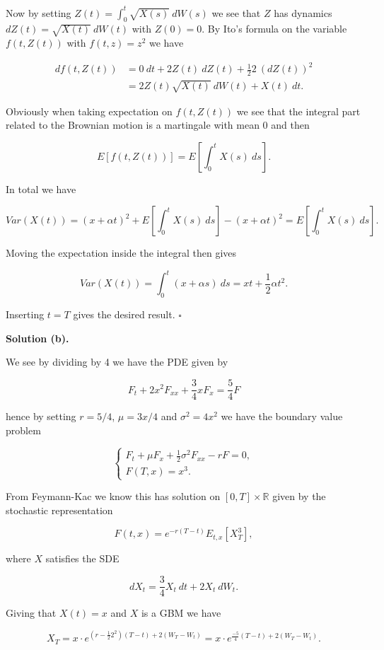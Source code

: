 \documentclass[
]{book}
\begin{document}
Now by setting \(Z(t)= \int_0^t\sqrt{X(s)}\ dW(s)\) we see that \(Z\) has dynamics \(dZ(t)=\sqrt{X(t)}\ dW(t)\) with \(Z(0)=0\). By Ito's formula on the variable \(f(t,Z(t))\) with \(f(t,z)=z^2\) we have

\begin{align*}
df(t,Z(t))&=0\ dt+2Z(t)\ dZ(t)+\frac{1}{2}2\ (dZ(t))^2\\
&=2Z(t)\sqrt{X(t)}\ dW(t)+X(t)\ dt.
\end{align*}

Obviously when taking expectation on \(f(t,Z(t))\) we see that the integral part related to the Brownian motion is a martingale with mean 0 and then

\[
E[f(t,Z(t))]=E\left[\int_0^t X(s)\ ds\right].
\]

In total we have

\[
Var(X(t))=(x+\alpha t)^2+E\left[\int_0^t X(s)\ ds\right]-(x+\alpha t)^2=E\left[\int_0^t X(s)\ ds\right].
\]

Moving the expectation inside the integral then gives

\[
Var(X(t))=\int_0^t(x+\alpha s)\ ds=xt+\frac{1}{2}\alpha t^2.
\]

Inserting \(t=T\) gives the desired result. \(\square\)

\noindent\makebox[\linewidth]{\rule{\textwidth}{0.4pt}}

\textbf{Solution (b).}

We see by dividing by 4 we have the PDE given by

\[
F_t+2x^2F_{xx}+\frac{3}{4}xF_x=\frac{5}{4}F
\]

hence by setting \(r=5/4\), \(\mu=3x/4\) and \(\sigma^2=4x^2\) we have the boundary value problem

\[
\begin{cases}
F_t+\mu F_x+\frac{1}{2}\sigma ^2F_{xx}-rF=0,\\
F(T,x)=x^3.
\end{cases}
\]

From Feymann-Kac we know this has solution on \([0,T]\times\mathbb{R}\) given by the stochastic representation

\[
F(t,x)=e^{-r(T-t)}E_{t,x}[X_T^3],
\]

where \(X\) satisfies the SDE

\[
dX_t=\frac{3}{4}X_t\ dt+2X_t\ dW_t.
\]

Giving that \(X(t)=x\) and \(X\) is a GBM we have

\[
X_T=x\cdot e^{\left(r-\frac{1}{2}2^2\right)(T-t)+2(W_T-W_t)}=x\cdot e^{\frac{-5}{4}(T-t)+2(W_T-W_t)}.
\]
\end{document}
